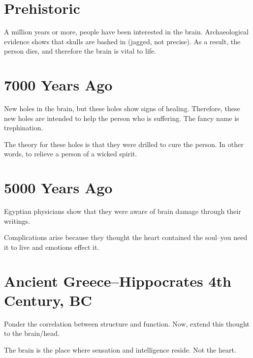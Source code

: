 \section{Prehistoric}

\begin{coloredlist}
    \item A million years or more, people have been interested in the brain. Archaeological evidence shows that skulls are bashed in (jagged, not precise). As a result, the person dies, and therefore the brain is vital to life.
\end{coloredlist}

\section{7000 Years Ago}

\begin{coloredlist}
    \item New holes in the brain, but these holes show signs of healing. Therefore, these new holes are intended to help the person who is suffering.
    The fancy name is trephination.
    \item The theory for these holes is that they were drilled to cure the person. In other words, to relieve a person of a wicked spirit.
\end{coloredlist}

\section{5000 Years Ago}

\begin{coloredlist}
    \item Egyptian physicians show that they were aware of brain damage through their writings.
    \item Complications arise because they thought the heart contained the soul--you need it to live and emotions effect it.
\end{coloredlist}

\section{Ancient Greece--Hippocrates 4th Century, BC}

\begin{coloredlist}
    \item Ponder the correlation between structure and function. Now, extend this thought to the brain/head.
    \item The brain is the place where sensation and intelligence reside. Not the heart.
\end{coloredlist}

